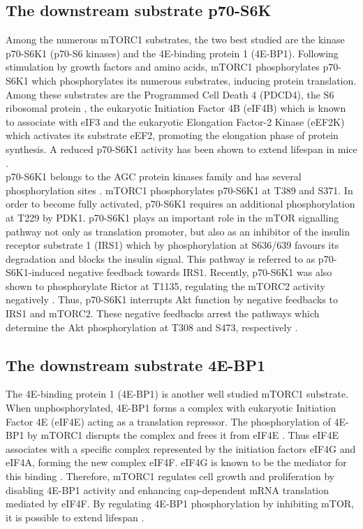 \subsection{The downstream substrate p70-S6K}
\label{subsec:The downstream substrate p70-S6K}
Among the numerous mTORC1 substrates, the two best studied are the kinase p70-S6K1 (p70-S6 kinases) and the 4E-binding protein 1 (4E-BP1). Following stimulation by growth factors and amino acids, mTORC1 phosphorylates p70-S6K1 which phosphorylates its numerous substrates, inducing protein translation. Among these substrates are the Programmed Cell Death 4 (PDCD4), the S6 ribosomal protein \citep{Heinonen2008}, the eukaryotic Initiation Factor 4B (eIF4B) which is known to associate with eIF3 and the eukaryotic Elongation Factor-2 Kinase (eEF2K) which activates its substrate eEF2, promoting the elongation phase of protein synthesis. A reduced p70-S6K1 activity has been shown to extend lifespan in mice \citep{Selman2009}.\\
p70-S6K1 belongs to the AGC protein kinases family and has several phosphorylation sites \citep{Jacinto2008}. mTORC1 phosphorylates p70-S6K1 at T389 and S371. In order to become fully activated, p70-S6K1 requires an additional phosphorylation at T229 by PDK1. p70-S6K1 plays an important role in the mTOR signalling pathway not only as translation promoter, but also as an inhibitor of the insulin receptor substrate 1 (IRS1) which by phosphorylation at S636/639 \citep{Dann2007, Tremblay2007} favours its degradation and blocks the insulin signal. This pathway is referred to as p70-S6K1-induced negative feedback towards IRS1. Recently, p70-S6K1 was also shown to phosphorylate Rictor at T1135, regulating the mTORC2 activity negatively \citep{Julien2010, Treins2010}. Thus, p70-S6K1 interrupts Akt function by negative feedbacks to IRS1 and mTORC2. These negative feedbacks arrest the pathways which determine the Akt phosphorylation at T308 and S473, respectively \citep{Foster2010}.

\subsection{The downstream substrate 4E-BP1}
\label{subsec:The downstream substrate 4E-BP1}
The 4E-binding protein 1 (4E-BP1) is another well studied mTORC1 substrate. When unphosphorylated, 4E-BP1 forms a complex with eukaryotic Initiation Factor 4E (eIF4E) acting as a translation repressor. The phosphorylation of 4E-BP1 by mTORC1 disrupts the complex and frees it from eIF4E \citep{Dann2006}. Thus eIF4E associates with a specific complex represented by the initiation factors eIF4G and eIF4A, forming the new complex eIF4F. eIF4G is known to be the mediator for this binding \citep{Gingras1999}. Therefore, mTORC1 regulates cell growth and proliferation by disabling 4E-BP1 activity and enhancing cap-dependent mRNA translation mediated by eIF4F. By regulating 4E-BP1 phosphorylation by inhibiting mTOR, it is possible to extend lifespan \citep{Kapahi2009}.

